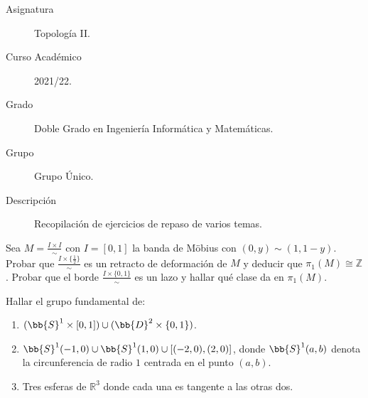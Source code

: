 \documentclass[12pt]{article}
\begin{document}

    
    

    \begin{description}
        \item[Asignatura] Topología II.
        \item[Curso Académico] 2021/22.
        \item[Grado] Doble Grado en Ingeniería Informática y Matemáticas.
        \item[Grupo] Grupo Único.
        \item[Descripción] Recopilación de ejercicios de repaso de varios temas.
    \end{description}
    \newpage


    
    \begin{ejercicio}
        Sea $M = \frac{I\times I}{\sim}$ con $I = [0,1]$ la banda de Möbius con $(0,y)\sim (1,1-y)$. Probar que $\frac{I\times \{\frac{1}{2}\}}{\sim}$ es un retracto de deformación de $M$ y deducir que $\pi_1(M) \cong \mathbb{Z}$. Probar que el borde $\frac{I\times \{0,1\}}{\sim}$ es un lazo y hallar qué clase da en $\pi_1(M)$.
    \end{ejercicio}

    \begin{ejercicio}
        Hallar el grupo fundamental de:
        \begin{enumerate}
            \item $(\bb{S}^1\times [0,1])\cup (\bb{D}^2\times \{0,1\})$.
            \item $\bb{S}^1(-1,0)\cup \bb{S}^1(1,0)\cup [(-2,0),(2,0)]$, donde $\bb{S}^1(a,b)$ denota la circunferencia de radio $1$ centrada en el punto $(a,b)$.
            \item Tres esferas de $\mathbb{R}^3$ donde cada una es tangente a las otras dos.
        \end{enumerate}
    \end{ejercicio}
\end{document}
